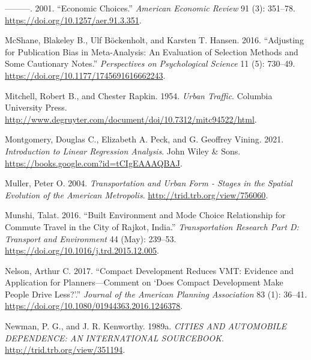 \documentclass[
  11pt,
  openany]{memoir}
\newlength{\cslhangindent}
\newlength{\cslentryspacingunit} %
\newenvironment{CSLReferences}[2] %
 {%
  \setlength{\parindent}{0pt}
  \ifodd #1
  \let\oldpar\par
  \def\par{\hangindent=\cslhangindent\oldpar}
  \fi
  \setlength{\parskip}{#2\cslentryspacingunit}
 }%
 {}
\begin{document}
\begin{CSLReferences}{1}{0}
\leavevmode{}%
---------. 2001. {``Economic {Choices}.''} \emph{American Economic Review} 91 (3): 351--78. \url{https://doi.org/10.1257/aer.91.3.351}.

\leavevmode{}%
McShane, Blakeley B., Ulf Böckenholt, and Karsten T. Hansen. 2016. {``Adjusting for {Publication Bias} in {Meta}-{Analysis}: An {Evaluation} of {Selection Methods} and {Some Cautionary Notes}.''} \emph{Perspectives on Psychological Science} 11 (5): 730--49. \url{https://doi.org/10.1177/1745691616662243}.

\leavevmode{}%
Mitchell, Robert B., and Chester Rapkin. 1954. \emph{Urban {Traffic}}. {Columbia University Press}. \url{http://www.degruyter.com/document/doi/10.7312/mitc94522/html}.

\leavevmode{}%
Montgomery, Douglas C., Elizabeth A. Peck, and G. Geoffrey Vining. 2021. \emph{Introduction to {Linear Regression Analysis}}. {John Wiley \& Sons}. \url{https://books.google.com?id=tCIgEAAAQBAJ}.

\leavevmode{}%
Muller, Peter O. 2004. \emph{Transportation and {Urban Form} - {Stages} in the {Spatial Evolution} of the {American Metropolis}}. \url{http://trid.trb.org/view/756060}.

\leavevmode{}%
Munshi, Talat. 2016. {``Built Environment and Mode Choice Relationship for Commute Travel in the City of {Rajkot}, {India}.''} \emph{Transportation Research Part D: Transport and Environment} 44 (May): 239--53. \url{https://doi.org/10.1016/j.trd.2015.12.005}.

\leavevmode{}%
Nelson, Arthur C. 2017. {``Compact {Development Reduces VMT}: Evidence and {Application} for {Planners}---{Comment} on {`{Does Compact Development Make People Drive Less}?'}.''} \emph{Journal of the American Planning Association} 83 (1): 36--41. \url{https://doi.org/10.1080/01944363.2016.1246378}.

\leavevmode{}%
Newman, P. G., and J. R. Kenworthy. 1989a. \emph{{CITIES AND AUTOMOBILE DEPENDENCE}: {AN INTERNATIONAL SOURCEBOOK}}. \url{http://trid.trb.org/view/351194}.


\end{CSLReferences}
\end{document}

